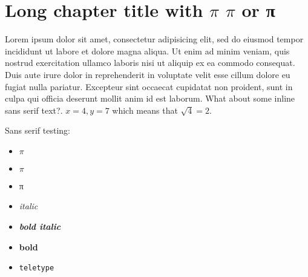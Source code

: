 \chapter{Long chapter title with \texorpdfstring{$\pi$ $π$ or π}{π π or π}}

Lorem ipsum dolor sit amet, consectetur adipisicing elit, sed do eiusmod tempor incididunt ut labore et dolore magna aliqua. Ut enim ad minim veniam, quis nostrud exercitation ullamco laboris nisi ut aliquip ex ea commodo consequat. Duis aute irure dolor in reprehenderit in voluptate velit esse cillum dolore eu fugiat nulla pariatur. Excepteur sint occaecat cupidatat non proident, sunt in culpa qui officia deserunt mollit anim id est laborum. \textsf{What about some inline sans serif text?}. $x = 4, y= 7$ which means that $\sqrt{4} = 2$.

Sans serif testing:
\begin{itemize}
    \item \textsf{$\pi$}
    \item \textsf{$π$}
    \item \textsf{π}
    \item \textsf{\emph{italic}}
    \item \textsf{\textbf{\emph{bold italic}}}
    \item \textsf{\textbf{bold}}
    \item \textsf{\texttt{teletype}}
\end{itemize}

